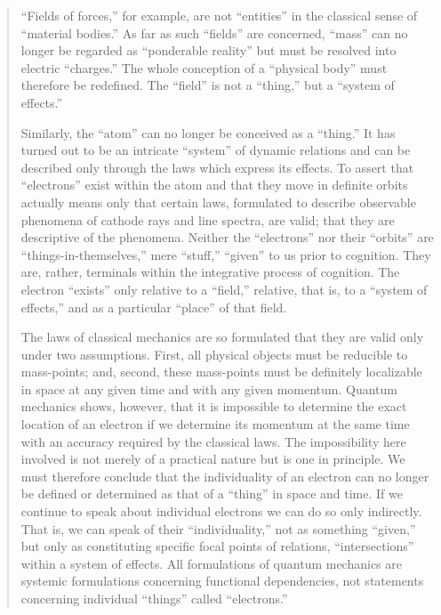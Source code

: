 \documentclass{article}
\begin{document}
\begin{quote}
    ``Fields of forces,'' for example, are not ``entities'' in the classical sense of ``material bodies.''  As far as such ``fields'' are concerned, ``mass'' can no longer be regarded as ``ponderable reality'' but must be resolved into electric ``charges.''  The whole conception of a ``physical body'' must therefore be redefined.  The ``field'' is not a ``thing,'' but a ``system of effects.''

    Similarly, the ``atom'' can no longer be conceived as a ``thing.''  It has turned out to be an intricate ``system'' of dynamic relations and can be described only through the laws which express its effects.  To assert that ``electrons'' exist within the atom and that they move in definite orbits actually means only that certain laws, formulated to describe observable phenomena of cathode rays and line spectra, are valid; that they are descriptive of the phenomena.  Neither the ``electrons'' nor their ``orbits'' are ``things-in-themselves,'' mere ``stuff,'' ``given'' to us prior to cognition.  They are, rather, terminals within the integrative process of cognition.  The electron ``exists'' only relative to a ``field,'' relative, that is, to a ``system of effects,'' and as a particular ``place'' of that field.  

    The laws of classical mechanics are so formulated that they are valid only under two assumptions.  First, all physical objects must be reducible to mass-points; and, second, these mass-points must be definitely localizable in space at any given time and with any given momentum.  Quantum mechanics shows, however, that it is impossible to determine the exact location of an electron if we determine its momentum at the same time with an accuracy required by the classical laws.  The impossibility here involved is not merely of a practical nature but is one in principle.  We must therefore conclude that the individuality of an electron can no longer be defined or determined as that of a ``thing'' in space and time.  If we continue to speak about individual electrons we can do so only indirectly.  That is, we can speak of their ``individuality,'' not as something ``given,'' but only as constituting specific focal points of relations, ``intersections'' within a system of effects.  All formulations of quantum mechanics are systemic formulations concerning functional dependencies, not statements concerning individual ``things'' called ``electrons.''  \citep[p. 773-776]{WerkmeisterCassirer}
\end{quote}
\end{document}

